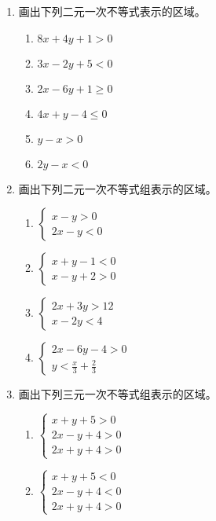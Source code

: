 \begin{ex}
\begin{enumerate}
    \item 画出下列二元一次不等式表示的区域。
\begin{multicols}{2}
\begin{enumerate}
    \item $8x+4y+1>0$
    \item $3x-2y+5<0$
    \item $2x-6y+1\ge 0$
    \item $4x+y-4\le 0$
    \item $y-x>0$
    \item $2y-x<0$
\end{enumerate}
\end{multicols}
\item 画出下列二元一次不等式组表示的区域。
\begin{multicols}{2}
\begin{enumerate}
\item $\begin{cases}
    x-y>0\\2x-y<0
\end{cases}$
\item $\begin{cases}
    x+y-1<0\\x-y+2>0
\end{cases}$
\item $\begin{cases}
    2x+3y>12\\ x-2y<4
\end{cases}$
\item $\begin{cases}
    2x-6y-4>0\\ y<\frac{x}{3}+\frac{2}{3}
\end{cases}$
\end{enumerate}
\end{multicols}
    \item 画出下列三元一次不等式组表示的区域。
\begin{multicols}{2}
\begin{enumerate}    
    \item $\begin{cases}
        x+y+5>0\\2x-y+4>0\\2x+y+4>0
    \end{cases}$
    \item $\begin{cases}
        x+y+5<0\\2x-y+4<0\\2x+y+4>0
    \end{cases}$
\end{enumerate}
\end{multicols}
\end{enumerate}
\end{ex}

